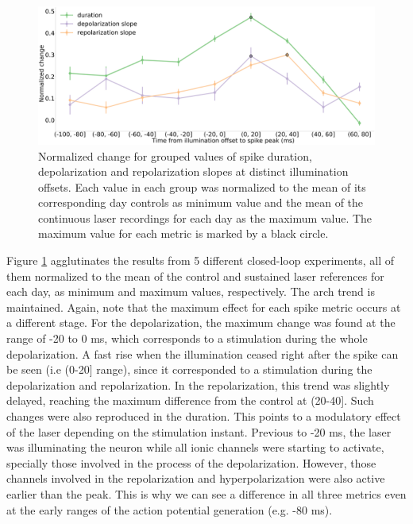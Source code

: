 \begin{figure}[htb!]
   \includegraphics[width=\textwidth]{img/laser/general_error_mean_norm_to_off_n5.pdf}
    \caption{Normalized change for grouped values of spike duration, depolarization and repolarization slopes at distinct illumination offsets. Each value in each group was normalized to the mean of its corresponding day controls as minimum value and the mean of the continuous laser recordings for each day as the maximum value. The maximum value for each metric is marked by a black circle. }
    \label{fig:activity dependent error mean }
\end{figure}

Figure \ref{fig:activity dependent error mean } agglutinates the results from 5 different closed-loop experiments, all of them normalized to the mean of the control and sustained laser references for each day, as minimum and maximum values, respectively. The arch trend is maintained. Again, note that the maximum effect for each spike metric occurs at a different stage. For the depolarization, the maximum change was found at the range of -20 to 0 ms, which corresponds to a stimulation during the whole depolarization. A fast rise when the illumination ceased right after the spike can be seen (i.e (0-20] range), since it corresponded to a stimulation during the depolarization and repolarization. In the repolarization, this trend was slightly delayed, reaching the maximum difference from the control at (20-40]. Such changes were also reproduced in the duration. This points to a modulatory effect of the laser depending on the stimulation instant. Previous to -20 ms, the laser was illuminating the neuron while all ionic channels were starting to activate, specially those involved in the process of the depolarization. However, those channels involved in the repolarization and hyperpolarization were also active earlier than the peak. This is why we can see a difference in all three metrics even at the early ranges of the action potential generation (e.g. -80 ms).

